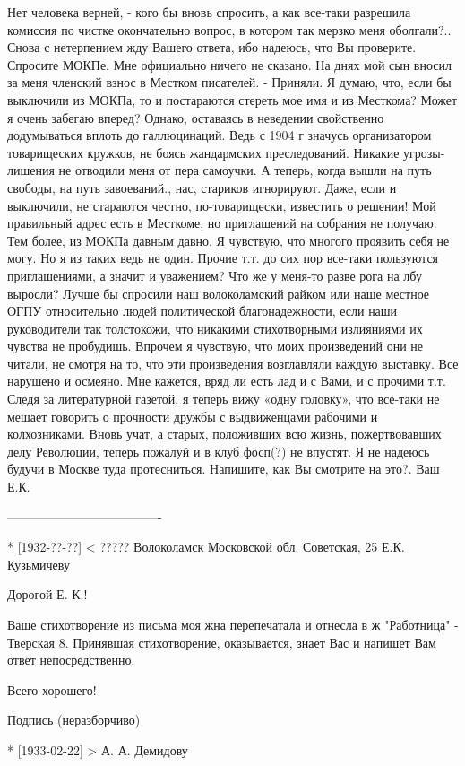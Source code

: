 Нет человека верней, - кого бы вновь спросить, а как все-таки разрешила комиссия по чистке окончательно вопрос, в котором так мерзко меня оболгали?.. Снова с нетерпением жду Вашего ответа, ибо надеюсь, что Вы проверите. Спросите МОКПе. Мне официально ничего не сказано. На днях мой сын вносил за меня членский взнос в Местком писателей. - Приняли.
Я думаю, что, если бы выключили из МОКПа, то и постараются стереть мое имя и из Месткома? Может я очень забегаю вперед? Однако, оставаясь в неведении свойственно додумываться вплоть до галлюцинаций. Ведь с 1904 г значусь организатором товарищеских кружков, не боясь жандармских преследований. Никакие угрозы-лишения не отводили меня от пера самоучки. А теперь, когда вышли на путь свободы, на путь завоеваний., нас, стариков игнорируют. Даже, если и выключили, не стараются честно, по-товарищески, известить о решении!
Мой правильный адрес есть в Месткоме, но приглашений на собрания не получаю. Тем более, из МОКПа давным давно. Я чувствую, что многого проявить себя не могу. Но я из таких ведь не один. Прочие т.т. до сих пор все-таки пользуются приглашениями, а значит и уважением? Что же у меня-то разве рога на лбу выросли? Лучше бы спросили наш волоколамский райком или наше местное ОГПУ относительно людей политической благонадежности, если наши руководители так толстокожи, что никакими стихотворными излияниями их чувства не пробудишь. Впрочем я чувствую, что моих произведений они не читали, не смотря на то, что эти произведения возглавляли каждую выставку. Все нарушено и осмеяно. Мне кажется, вряд ли есть лад и с Вами, и с прочими т.т. Следя за литературной газетой, я теперь вижу «одну головку», что все-таки не мешает говорить о прочности дружбы с выдвиженцами рабочими и колхозниками. Вновь учат, а старых, положивших всю жизнь,  пожертвовавших делу Революции, теперь пожалуй и в клуб фосп(?) не впустят. Я не надеюсь будучи в Москве туда протесниться. Напишите, как Вы смотрите на это?. Ваш Е.К.


-------------------------------------

* [1932-??-??] < ?????
Волоколамск Московской обл. Советская, 25
Е.К. Кузьмичеву

Дорогой Е. К.!

Ваше стихотворение из письма моя жна перепечатала и отнесла в ж "Работница" - Тверская 8.
Принявшая стихотворение, оказывается, знает Вас и напишет Вам ответ непосредственно.

Всего хорошего!

Подпись (неразборчиво)

* [1933-02-22] > А. А. Демидову 

